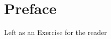 \documentclass[../Main.tex]{subfiles}
\begin{document}
\chapter*{Preface}
Left as an Exercise for the reader
\end{document}
